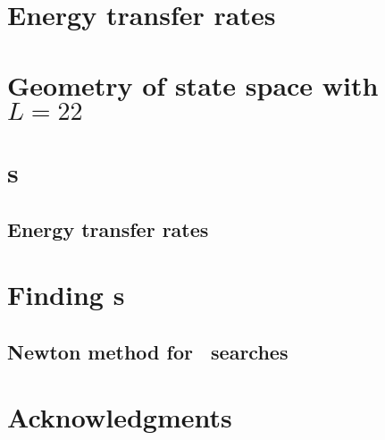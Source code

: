 \documentclass{siamltex}
\begin{document}


\section{\KSe}
\label{s-KS}


\section{Energy transfer rates} %
\label{sec:energy}


\section{Geometry of state space with $L=22$}
\label{sec:L22}




\section{\Rpo s}
\label{sec:rpos}


\subsection{Energy transfer rates} %
\label{sec:energyL22}


    \PublicPrivate{%
        }{%

    } %



\appendix

\section{Finding \rpo s}
\label{sec:lmderRLD}


\subsection{Newton method  for \rpo\ searches}
\label{sec:NewtRPOs}




\section*{Acknowledgments}




    \PublicPrivate{%
        }{%
\newpage

    } %
\end{document}
